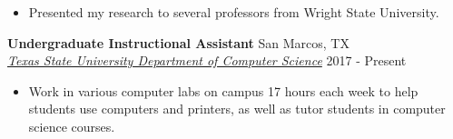 \documentclass[letterpaper, 10pt]{article}
\newcommand{\ressubheading}[4]{
    \textbf{#1} \hfill #2 \\[0pt]
    \textit{#3} \hfill #4 \\[0pt]
}
\newenvironment{resitemize}{
    \vspace{-6pt}
    \begin{itemize}
    \setlength\itemsep{-2pt}
}{
    \end{itemize}
}
\begin{document}
\begin{NoHyper}
\begin{resitemize}
        \item Presented my research to several professors from Wright State University.
    \end{resitemize} 
\ressubheading{Undergraduate Instructional Assistant}{San Marcos, TX}{\href{https://cs.txstate.edu/accounts/lab_assistants/}{Texas State University Department of Computer Science}}{2017 - Present}
    \begin{resitemize}
        \item Work in various computer labs on campus 17 hours each week to help students use computers and printers, as well as tutor students in computer science courses.
    \end{resitemize}
        

\end{NoHyper}
\end{document}
